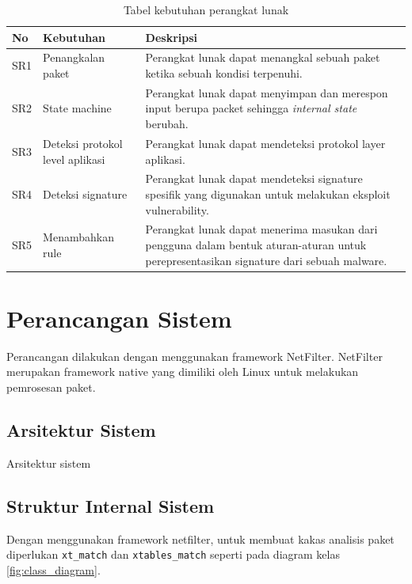\begin{table}[H]
	\caption{Tabel kebutuhan perangkat lunak}
	\label{table:software_requirement}
	\begin{tabularx}{\textwidth}{|l|X|X|}
		\hline
		\textbf{No} & \textbf{Kebutuhan} & \textbf{Deskripsi} \\ \hline
		SR1 & Penangkalan paket & Perangkat lunak dapat menangkal sebuah paket ketika sebuah kondisi terpenuhi. \\ \hline 
		SR2 & State machine & Perangkat lunak dapat menyimpan dan merespon input berupa packet sehingga \textit{internal state} berubah. \\ \hline
		SR3 & Deteksi protokol level aplikasi & Perangkat lunak dapat mendeteksi protokol layer aplikasi. \\ \hline
		SR4 & Deteksi signature & Perangkat lunak dapat mendeteksi signature spesifik yang digunakan untuk melakukan eksploit vulnerability.\\ \hline
		SR5 & Menambahkan rule & Perangkat lunak dapat menerima masukan dari pengguna dalam bentuk aturan-aturan untuk perepresentasikan signature dari sebuah malware.\\ \hline
	\end{tabularx}
\end{table}

\section{Perancangan Sistem}

Perancangan dilakukan dengan menggunakan framework NetFilter. NetFilter merupakan framework native yang dimiliki oleh Linux untuk melakukan pemrosesan paket.


\subsection{Arsitektur Sistem}

Arsitektur sistem 

\subsection{Struktur Internal Sistem}

Dengan menggunakan framework netfilter, untuk membuat kakas analisis paket diperlukan \verb|xt_match| dan \verb|xtables_match| seperti pada diagram kelas \ref{fig:class_diagram}.

